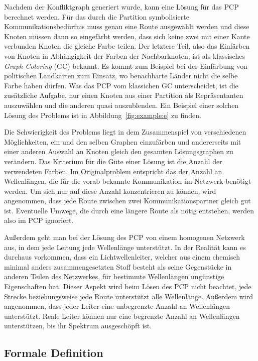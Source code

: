 Nachdem der Konfliktgraph generiert wurde, kann eine Lösung für das PCP berechnet werden. Für das durch die Partition symbolisierte Kommunikationsbedürfnis muss genau eine Route ausgewählt werden und diese Knoten müssen dann so eingefärbt werden, dass sich keine zwei mit einer Kante verbunden Knoten die gleiche Farbe teilen. Der letztere Teil, also das Einfärben von Knoten in Abhängigkeit der Farben der Nachbarknoten, ist als klassisches \textit{Graph Coloring} (GC) bekannt. Es kommt zum Beispiel bei der Einfärbung von politischen Landkarten zum Einsatz, wo benachbarte Länder nicht die selbe Farbe haben dürfen. Was das PCP vom klassichen GC unterscheidet, ist die zusätzliche Aufgabe, nur einen Knoten aus einer Partition als Repräsentanten auszuwählen und die anderen quasi auszublenden. Ein Beispiel einer solchen Lösung des Problems ist in Abbildung~\ref{fig:example:e} zu finden.

Die Schwierigkeit des Problems liegt in dem Zusammenspiel von verschiedenen Möglichkeiten, ein und den selben Graphen einzufärben und andererseits mit einer anderen Auswahl an Knoten gleich den gesamten Lösungsgraphen zu verändern. Das Kriterium für die Güte einer Lösung ist die Anzahl der verwendeten Farben. Im Originalproblem entspricht das der Anzahl an Wellenlängen, die für die vorab bekannte Kommunikation im Netzwerk benötigt werden. Um sich nur auf diese Anzahl konzentrieren zu können, wird angenommen, dass jede Route zwischen zwei Kommunikationspartner gleich gut ist. Eventuelle Umwege, die durch eine längere Route als nötig entstehen, werden also im PCP ignoriert. 

Außerdem geht man bei der Lösung des PCP von einem homogenen Netzwerk aus, in dem jede Leitung jede Wellenlänge unterstützt. In der Realität kann es durchaus vorkommen, dass ein Lichtwellenleiter, welcher aus einem chemisch minimal anders zusammengesetzten Stoff besteht als seine Gegenstücke in anderen Teilen des Netzwerkes, für bestimmte Wellenlängen ungünstige Eigenschaften hat. Dieser Aspekt wird beim Lösen des PCP nicht beachtet, jede Strecke beziehungsweise jede Route unterstützt alle Wellenlänge. Außerdem wird angenommen, dass jeder Leiter eine unbegrenzte Anzahl an Wellenlängen unterstützt. Reale Leiter können nur eine begrenzte Anzahl an Wellenlängen unterstützen, bis ihr Spektrum ausgeschöpft ist.

\subsection{Formale Definition}

